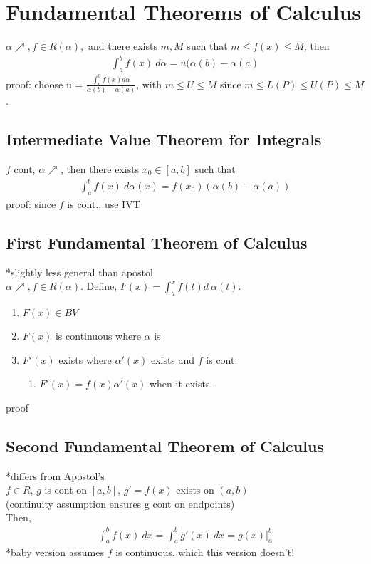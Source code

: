 \documentclass[12pt]{article}
\newcommand{\eq}[1]{\begin{align*}#1\end{align*}} %
\newcommand{\gray}[1]{\textcolor[gray]{0.5}{#1}} %
\begin{document}
{\section*{Fundamental Theorems of Calculus}

$\alpha \nearrow, f \in R(\alpha),$ and there exists $m, M$ such that $m \leq f(x) \leq M$, then
\eq{\int_a^b f(x)\ d\alpha = u (\alpha(b) - \alpha(a) \tag{some $u \in [m, M]$}}
\gray{proof: choose u = $\frac{\int_a^b f(x) d \alpha}{\alpha(b) - \alpha(a)}$, with $m \leq U \leq M$ since $m \leq L(P) \leq U(P) \leq M$.}


\subsection*{Intermediate Value Theorem for Integrals}
$f$ cont, $\alpha \nearrow$, then there exists $x_0 \in [a, b]$ such that 
\eq{\int_a^b f(x)\ d \alpha(x) = f(x_0) (\alpha(b) - \alpha(a))}
\gray{proof: since $f$ is cont., use IVT}

\subsection*{First Fundamental Theorem of Calculus}
*slightly less general than apostol\\
$\alpha \nearrow, f \in R(\alpha)$. 
Define, $F(x) = \int_a^x f(t) d\ \alpha(t).$
\begin{enumerate}
    \item $F(x) \in BV$
    \item $F(x)$ is continuous where $\alpha$ is 
    \item $F'(x)$ exists where $\alpha'(x)$ exists and $f$ is cont. 
    \begin{enumerate}
        \item $F'(x) = f(x)\alpha'(x)$ when it exists.
    \end{enumerate}
\end{enumerate}
\gray{proof}

\subsection*{Second Fundamental Theorem of Calculus}
*differs from Apostol's\\
$f \in R$, $g$ is cont on $[a, b]$, $g' = f(x)$ exists on $(a, b)$\\
(continuity assumption ensures g cont on endpoints)\\
Then, 
\eq{\int_a^b f(x)\ dx = \int_a^b g'(x)\ dx = g(x) \bigg |_a^b }
*baby version assumes $f$ is continuous, which this version doesn't!

}
\end{document}
